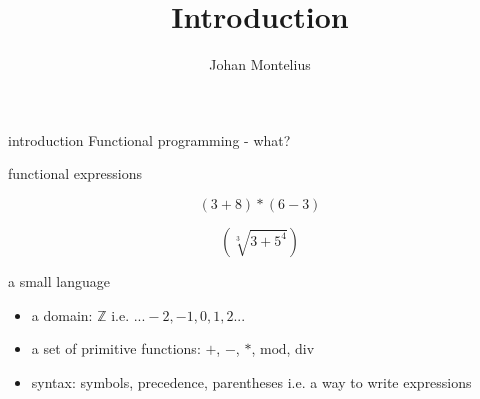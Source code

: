 


\title[ID1019 Introduction]{Introduction}

\author{Johan Montelius}
\date{\semester}



\begin{frame}
\titlepage
\end{frame}

\begin{frame}{introduction}
  Functional programming - what?
\end{frame}


\begin{frame}{functional expressions}

$$(3 + 8) * (6 - 3)$$

\pause\vspace{20pt}

$$(\sqrt[3]{3 + 5^4})$$

\end{frame}

\begin{frame}{a small language}

\pause

\begin{itemize}
 \item a domain: $\mathbb{Z}$ i.e. ${... -2,-1,0,1,2... }$
\pause
 \item a set of primitive functions: $+$, $-$, $*$, $\mathrm{mod}$,  $\mathrm{div}$ 
\pause
 \item syntax: symbols, precedence, parentheses i.e. a way to write expressions
\end{itemize}

\end{frame}


